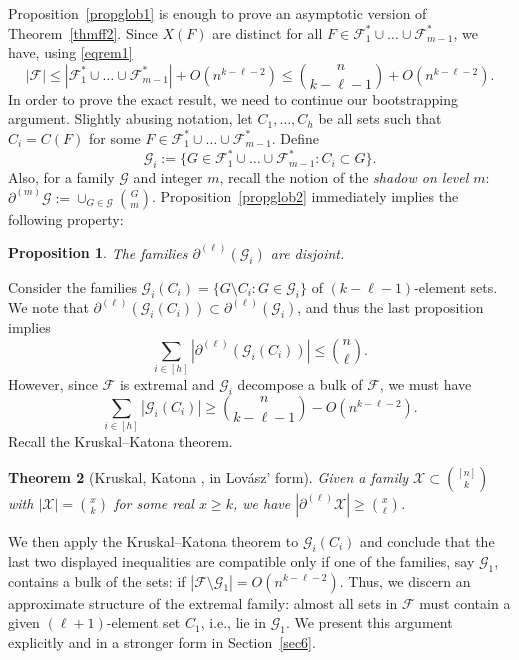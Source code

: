 \documentclass[graybox]{svmult}
\renewcommand{\le}{\leqslant}
\renewcommand{\ge}{\geqslant}
\newcommand{\ff}{\mathcal{F}}
\newcommand{\m}{\mathcal}
\newtheorem{thm}{Theorem}
\newtheorem{prop}[thm]{Proposition}
\begin{document}
Proposition~\ref{propglob1} is enough to prove an asymptotic version of Theorem~\ref{thmff2}. Since $X(F)$ are distinct for all $F\in \ff_1^*\cup\ldots\cup \ff_{m-1}^*$, we have, using \eqref{eqrem1}
\begin{equation}\label{eqff14}|\ff|\le |\ff_1^*\cup\ldots\cup \ff_{m-1}^*|+O(n^{k-\ell-2})\le {n\choose k-\ell-1}+O(n^{k-\ell-2}).\end{equation}
In order to prove the exact result, we need to continue our bootstrapping argument. Slightly abusing notation, let $C_1,\ldots, C_h$ be all sets such that $C_i = C(F)$ for some $F\in \ff_1^*\cup\ldots\cup \ff_{m-1}^*$. Define
$$\m G_i:= \{G\in \ff_1^*\cup\ldots\cup\ff_{m-1}^*: C_i\subset G\}.$$ Also, for a family $\m G$ and integer $m$, recall the notion of the {\it shadow on level $m$}: $\partial^{(m)}\m G:= \cup_{G\in \m G}{G\choose m}$. Proposition~\ref{propglob2} immediately implies the following property:
\begin{prop}\label{propglob3}
  The families $\partial^{(\ell)}(\m G_i)$ are disjoint.
\end{prop}
Consider the families $\m G_i(C_i)= \{G\setminus C_i: G\in \m G_i\}$ of $(k-\ell-1)$-element sets. We note that $\partial^{(\ell)}(\m G_i(C_i))\subset\partial^{(\ell)}(\m G_i)$, and thus the last proposition implies 
\begin{equation}
\label{eqshadowsum} \sum_{i\in [h]}|\partial^{(\ell)}(\m G_i(C_i))|\le {n\choose \ell}.
\end{equation}
However, since $\ff$ is extremal and $\m G_i$ decompose a bulk of $\ff$, we must have $$\sum_{i\in [h]}|\m G_i(C_i)|\ge {n\choose k-\ell-1}-O(n^{k-\ell-2}).$$
Recall the Kruskal--Katona theorem.
\begin{thm}[Kruskal, Katona \cite{Kr,Ka}, in Lov\'asz' form] \label{thmkk} Given a family $\mathcal X\subset {[n]\choose k}$ with $|\m X| = {x\choose k}$ for some real $x\ge k$, we have $|\partial^{(\ell)}\m X|\ge {x\choose \ell}$.\end{thm}
We then apply the Kruskal--Katona theorem to $\m G_i(C_i)$ and conclude that the last two displayed inequalities are compatible only if one of the families, say $\m G_1$, contains a bulk of the sets: if $|\ff\setminus \m G_1|= O(n^{k-\ell-2})$. Thus, we discern an approximate structure of the extremal family: almost all sets in $\ff$ must contain a given $(\ell+1)$-element set $C_1$, i.e., lie in $\m G_1$. We present this argument explicitly and in a stronger form in Section~\ref{sec6}.
\end{document}
